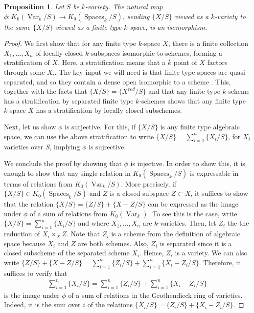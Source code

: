 \documentclass[12 pt]{amsart}
\theoremstyle{plain}
\newtheorem{proposition}[theorem]{Proposition}
\theoremstyle{definition}
\theoremstyle{remark}
\numberwithin{equation}{section}
\newcommand\grSpaces{K_0(\mathrm{Spaces}_k)} %
\newcommand{\on}[1]{\operatorname{#1}}
\begin{document}
\begin{proposition} \label{proposition:spaces-versus-schemes} 
	Let $S$ be $k$-variety.
	The natural map
	$\phi: K_0(\on{Var}_k/S) \to K_0(\on{Spaces}_k/S)$,
	sending $\{X/S\}$ viewed as a $k$-variety to the same $\{X/S\}$ viewed
	as a finite type $k$-space,
	is an isomorphism.
\end{proposition}
%
\begin{proof}
	We first show that for any finite type $k$-space $X$, there is a finite
	collection $X_1, \ldots, X_n$
	of locally closed $k$-subspaces isomorphic to schemes, forming a stratification of $X$. Here,
	a stratification means that a $\overline{k}$ point of $X$ factors through some $X_i$.
        The key input we will need is that finite type
	spaces are quasi-separated, and so they contain a dense open isomorphic to a
	scheme \cite[Thm.\  6.4.1]{olsson2016algebraic}.  
	This, together with the facts that
	$\{X/S\} = \{X^{red}/S\}$ and that any finite type $k$-scheme has a
	stratification by separated finite type $k$-schemes shows that
	any finite type $k$-space $X$ has a stratification by locally closed
	subschemes.

	Next, let us show $\phi$ is surjective. For this, if $\{X/S\}$ is any
	finite type algebraic space, we can use the above stratification to
	write
	$\{X/S\} = \sum_{i=1}^n \{X_i/S\}$, for $X_i$ varieties over $S$,
	implying $\phi$ is sujrective.

	We conclude the proof by showing that $\phi$ is injective.
	In order to show this, it is enough to show that any single relation in
	$K_0(\on{Spaces}_k/S)$ is expressable in terms of relations from
	$K_0(\on{Var}_k/S)$.
	More precisely, if $\{X/S\} \in K_0(\on{Spaces}_k/S)$ and $Z$ is a
	closed subspace $Z \subset X$, it suffices to show that the relation
	$\{X/S\} = \{Z/S\} + \{X - Z/S\}$ can be expressed as the image under
	$\phi$ of a sum of relations from $K_0(\on{Var}_k)$.
	To see this is the case, write $\{X/S\} = \sum_{i=1}^n \{X_i/S\}$ and
	where
	$X_1, \ldots, X_n$ are $k$-varieties. 
	Then, let $Z_i$ the the reduction of $X_i \times_X Z$.
	Note that $Z_i$ is a scheme from the definition of algebraic space 
	because $X_i$ and $Z$ are both schemes. Also, $Z_i$ is separated since it
	is a
	closed subscheme of the separated scheme $X_i$.
	Hence, $Z_i$ is a variety.
	We can also write $\{Z/S\} + \{X - Z/S\} = \sum_{i=1}^n
\{Z_i/S\} +\sum_{i=1}^n \{X_i-Z_i/S\}$.
	Therefore, it suffices to verify that
	\begin{align*}
	\sum_{i=1}^n \{X_i/S\} = \sum_{i=1}^n \{Z_i/S\} +
\sum_{i=1}^n \{X_i-Z_i/S\}
	\end{align*}
	is the image under $\phi$ of a sum of relations in the Grothendieck ring
	of varieties. Indeed, it is the sum over $i$ of the relations
	$\{X_i/S\} = \{Z_i/S\} + \{X_i-Z_i/S\}$.
\end{proof}
\end{document}
